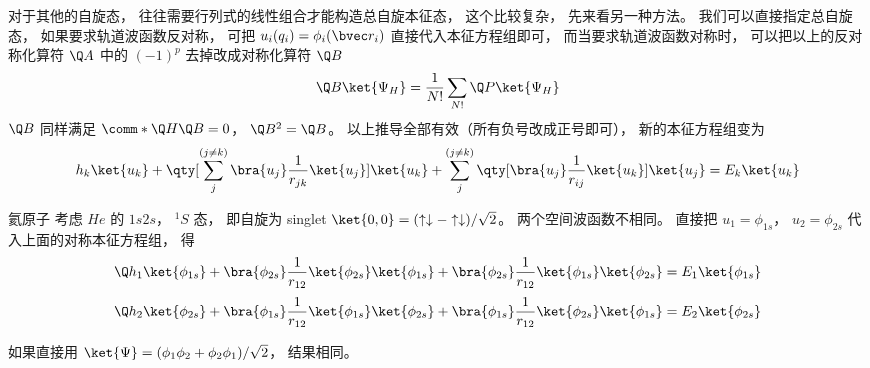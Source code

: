 对于其他的自旋态， 往往需要行列式的线性组合才能构造总自旋本征态， 这个比较复杂， 先来看另一种方法。 我们可以直接指定总自旋态， 如果要求轨道波函数反对称， 可把 $u_i(q_i) = \phi_i(\bvec r_i)$ 直接代入本征方程组即可， 而当要求轨道波函数对称时， 可以把以上的反对称化算符 $\Q A$ 中的 $(-1)^p$ 去掉改成对称化算符 $\Q B$ 
\begin{equation}
\Q B \ket{\Psi_H}  = \frac{1}{N!} \sum_{N!} \Q P\ket{\Psi_H}
\end{equation}
$\Q B$ 同样满足 $\comm*{\Q H}{\Q B} = 0$，  $\Q B^2 = \Q B$。  以上推导全部有效（所有负号改成正号即可）， 新的本征方程组变为
\begin{equation}
h_k \ket{u_k} + \qty[\sum_j^{(j \ne k)} \bra{u_j} \frac{1}{r_{jk}} \ket{u_j}] \ket{u_k} + \sum_j^{(j \ne k)} \qty[\bra{u_j} \frac{1}{r_{ij}} \ket{u_k}] \ket{u_j} = E_k \ket{u_k}
\end{equation}

\begin{example}{氦原子}
考虑 $He$ 的 $1s2s$，  $^1S$ 态， 即自旋为 singlet $\ket{0,0}  = (\uparrow\downarrow  -  \uparrow\downarrow)/\sqrt 2 $。  两个空间波函数不相同。 直接把 $u_1 = \phi_{1s}$， $u_2 = \phi_{2s}$ 代入上面的对称本征方程组， 得
\begin{equation}
\Q h_1 \ket{\phi_{1s}} + \bra{\phi_{2s}} \frac{1}{r_{12}} \ket{\phi_{2s}} \ket{\phi_{1s}} + \bra{\phi_{2s}} \frac{1}{r_{12}} \ket{\phi_{1s}} \ket{\phi_{2s}} = E_1\ket{\phi_{1s}}
\end{equation}
\begin{equation}
\Q h_2 \ket{\phi_{2s}} + \bra{\phi_{1s}} \frac{1}{r_{12}} \ket{\phi_{1s}} \ket{\phi_{2s}} + \bra{\phi_{1s}} \frac{1}{r_{12}} \ket{\phi_{2s}} \ket{\phi_{1s}} = E_2 \ket{\phi_{2s}} 
\end{equation}

如果直接用 $\ket{\Psi} = (\phi_1 \phi_2 + \phi_2\phi_1)/\sqrt 2$，  结果相同。
\end{example}
 
